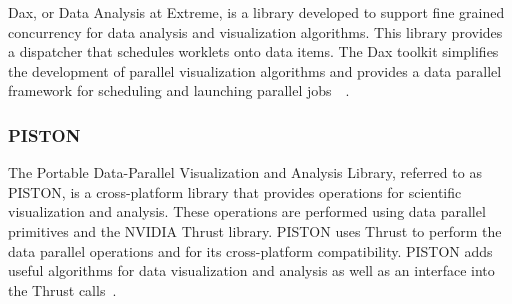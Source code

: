 Dax, or Data Analysis at Extreme, is a library developed to support fine grained concurrency for data analysis and visualization algorithms.
%
This library provides a dispatcher that schedules worklets onto data items.
%
The Dax toolkit simplifies the development of parallel visualization algorithms and provides a data parallel framework for scheduling and launching parallel jobs~\cite{morelanddax}~\cite{moreland2011dax}.

\subsubsection*{\textbf{PISTON}} 

The Portable Data-Parallel Visualization and Analysis Library, referred to as PISTON, is a cross-platform library that provides operations for scientific visualization and analysis.
%
These operations are performed using data parallel primitives and the NVIDIA Thrust library.
%
PISTON uses Thrust to perform the data parallel operations and for its cross-platform compatibility.
%
PISTON adds useful algorithms for data visualization and analysis as well as an interface into the Thrust calls~\cite{PISTON}.
